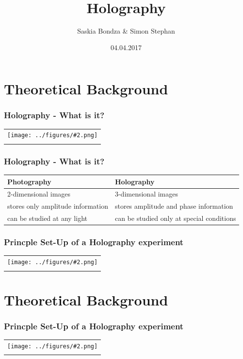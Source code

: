 \documentclass{beamer}
\title{Holography}
\author{Saskia Bondza \& Simon Stephan}
\date{04.04.2017}
\newcommand{\gra}[3][]{
	\begin{table}
	\centering
	\begin{tabular}[width=\textwidth]{c}
		\texttt{[image: ../figures/\#2.png]}\\
		\small #3
	\end{tabular}
	\end{table}
}
\begin{document}
\maketitle
\frame{\tableofcontents}
\section{Theoretical Background}
\frame{\tableofcontents[currentsection]}
\begin{frame}
	\frametitle{Holography - What is it?}
	\gra[0.7]{holo-schach}{}
\end{frame}
\begin{frame}
	\frametitle{Holography - What is it?}
	\begin{tabular}{p{5cm}|p{5cm}}
		\textbf{Photography}&\textbf{Holography}\\\hline
		2-dimensional images&3-dimensional images\\\hline
		stores only amplitude information&stores amplitude and phase information\\\hline
		can be studied at any light&can be studied only at special conditions
	\end{tabular}
\end{frame}

\begin{frame}
	\frametitle{Princple Set-Up of a Holography experiment}
	\gra[0.8]{PrincipleSetUp}{}
\end{frame}

\section{Theoretical Background}
\frame{\tableofcontents[currentsection]}
\begin{frame}
	\frametitle{Princple Set-Up of a Holography experiment}
	\gra[0.8]{PrincipleSetUp}{}
\end{frame}
\end{document}
